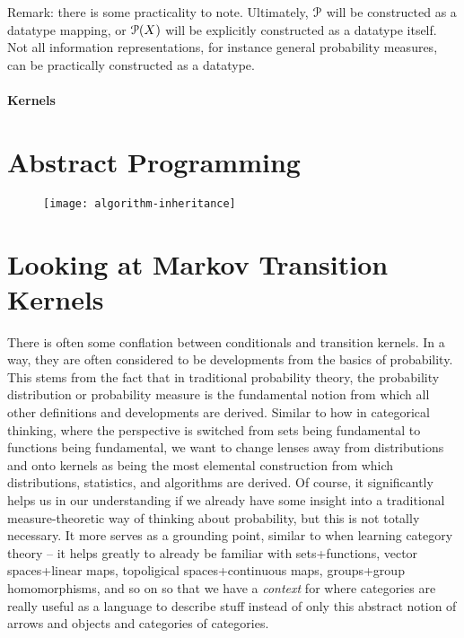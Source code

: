 Remark: there is some practicality to note. Ultimately, $\mathcal{P}$ will be constructed as a datatype mapping, or $\mathcal{P}(X)$ will be explicitly constructed as a datatype itself. Not all information representations, for instance general probability measures, can be practically constructed as a datatype.

\paragraph{Kernels}


\section{Abstract Programming}

\begin{figure}[htb]
    \texttt{[image: algorithm-inheritance]}
	\caption{}
    \label{fig:algorithm-inheritance}
\end{figure}

\section{Looking at Markov Transition Kernels}

There is often some conflation between conditionals and transition kernels.
In a way, they are often considered to be developments from the basics of probability.
This stems from the fact that in traditional probability theory, the probability distribution or probability measure is the fundamental notion from which all other definitions and developments are derived.
Similar to how in categorical thinking, where the perspective is switched from sets being fundamental to functions being fundamental, we want to change lenses away from distributions and onto kernels as being the most elemental construction from which distributions, statistics, and algorithms are derived. 
Of course, it significantly helps us in our understanding if we already have some insight into a traditional measure-theoretic way of thinking about probability, but this is not totally necessary.
It more serves as a grounding point, similar to when learning category theory -- it helps greatly to already be familiar with sets+functions, vector spaces+linear maps, topoligical spaces+continuous maps, groups+group homomorphisms, and so on so that we have a \emph{context} for where categories are really useful as a language to describe stuff instead of only this abstract notion of arrows and objects and categories of categories.

